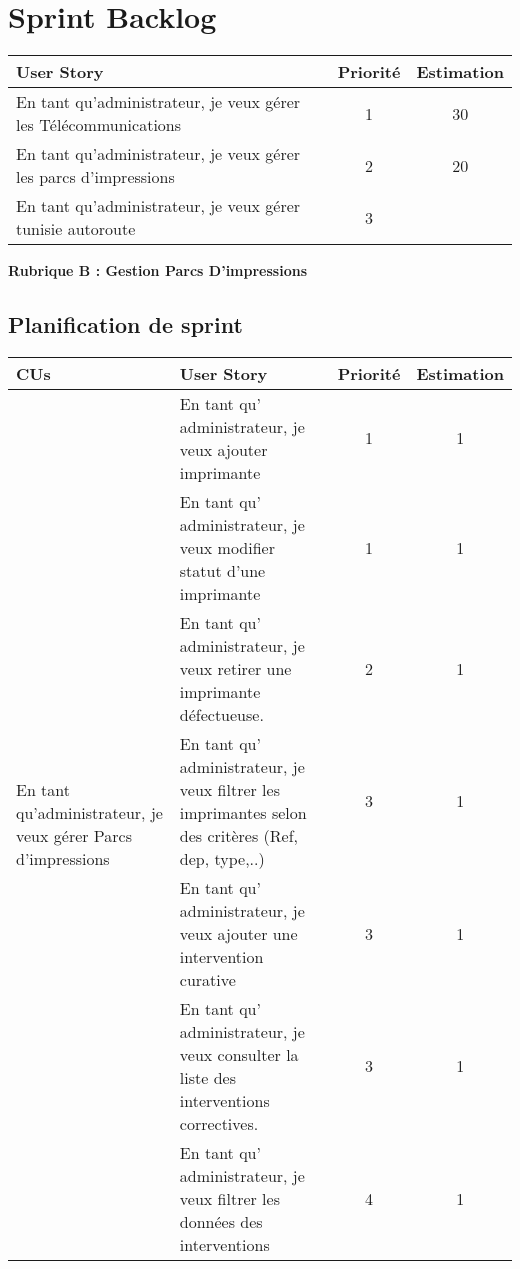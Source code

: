 \documentclass[a4paper,11pt]{report}
\begin{document}
\section{Sprint Backlog}

\begin{table}[h]
\centering
\begin{tabular}{|>{\raggedright\arraybackslash}p{7cm}|c|c|}
\hline
\textbf{User Story} & \textbf{Priorité} & \textbf{Estimation} \\
\hline
En tant qu’administrateur, je veux gérer les Télécommunications 
& 1 & 30 \\
\hline
En tant qu’administrateur, je veux gérer les parcs d’impressions 
& 2 & 20 \\
\hline
En tant qu’administrateur, je veux gérer tunisie autoroute 
& 3 &  \\
\hline
\end{tabular}
\end{table}
\newpage


\textbf{Rubrique B : Gestion  Parcs D'impressions}
\subsection{Planification de sprint }

\begin{tabular}{|m{4cm}|m{5cm}|c|c|}
\hline
\textbf{	CUs} & \textbf{User Story} & \textbf{Priorité} & \textbf{Estimation} \\
\hline

\multirow{7}{4cm}{En tant qu’administrateur, je veux gérer Parcs d’impressions} 
& En tant qu' administrateur, je veux ajouter imprimante & 1 & 1 \\
\cline{2-4}
& En tant qu' administrateur, je veux modifier statut d’une imprimante & 1 & 1 \\
\cline{2-4}
& En tant qu' administrateur, je veux retirer une imprimante défectueuse. & 2 & 1 \\
\cline{2-4}
& En tant qu' administrateur, je veux filtrer les imprimantes selon des critères (Ref, dep, type,..) & 3 & 1 \\
\cline{2-4}
& En tant qu' administrateur, je veux ajouter une intervention curative & 3 & 1 \\
\cline{2-4}
& En tant qu' administrateur, je veux consulter la liste des interventions correctives. & 3 & 1 \\
\cline{2-4}
& En tant qu' administrateur, je veux filtrer les données des interventions & 4 & 1 \\
\hline
\end{tabular}
\end{document}
